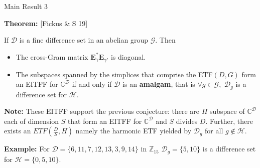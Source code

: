 \documentclass[12pt]{beamer}
\newcommand{\bbC}{\mathbb{C}}
\newcommand{\bbZ}{\mathbb{Z}}
\newcommand{\bfE}{\mathbf{E}}
\newcommand{\calD}{\mathcal{D}}
\newcommand{\calG}{\mathcal{G}}
\newcommand{\calH}{\mathcal{H}}
\begin{document}
\begin{frame}{Main Result 3}

\textbf{Theorem:} [Fickus \& S 19]\\\smallskip

If $\calD$ is a fine difference set in an abelian group $\calG$. Then
\begin{itemize}
    \item The cross-Gram matrix $\bfE_{\gamma}^*\bfE_{\gamma'}^{}$ is diagonal.
    \item The subspaces spanned by the simplices that comprise the ETF$(D,G)$ form an EITFF for $\bbC^\calD$ if and only if $\calD$ is an \textbf{amalgam}, that is $\forall g\in\calG,$ $\calD_g$ is a difference set for $\calH$.
\end{itemize}

\vfill

\textbf{Note:} These EITFF support the previous conjecture: there are $H$ subspace of $\bbC^{\calD}$ each of dimension $S$ that form an EITFF for $\bbC^{\calD}$ and $S$ divides $D$. Further, there exists an $ETF(\tfrac{D}{S},H)$ namely the harmonic ETF yielded by $\calD_g$ for all $g\not\in\calH.$

\vfill

\textbf{Example:} For $\calD=\{6,11,7,12,13,3,9,14\}$ in $\bbZ_{15}$ $\calD_g=\{5,10\}$ is a difference set for $\calH=\{0,5,10\}$.
\end{frame}
\end{document}
